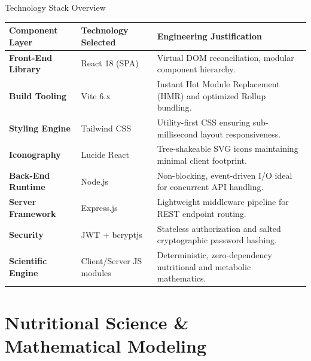 \documentclass[aspectratio=169,10pt]{beamer}
\begin{document}
\begin{frame}{Technology Stack Overview}
  \begin{table}[h]
    \centering
    \small
    \begin{tabular}{lll}
      \toprule
      \textbf{Component Layer} & \textbf{Technology Selected} & \textbf{Engineering Justification} \\
      \midrule
      \textbf{Front-End Library} & React 18 (SPA) & Virtual DOM reconciliation, modular component hierarchy. \\
      \textbf{Build Tooling} & Vite 6.x & Instant Hot Module Replacement (HMR) and optimized Rollup bundling. \\
      \textbf{Styling Engine} & Tailwind CSS & Utility-first CSS ensuring sub-millisecond layout responsiveness. \\
      \textbf{Iconography} & Lucide React & Tree-shakeable SVG icons maintaining minimal client footprint. \\
      \textbf{Back-End Runtime} & Node.js & Non-blocking, event-driven I/O ideal for concurrent API handling. \\
      \textbf{Server Framework} & Express.js & Lightweight middleware pipeline for REST endpoint routing. \\
      \textbf{Security} & JWT + bcryptjs & Stateless authorization and salted cryptographic password hashing. \\
      \textbf{Scientific Engine} & Client/Server JS modules & Deterministic, zero-dependency nutritional and metabolic mathematics. \\
      \bottomrule
    \end{tabular}
  \end{table}
\end{frame}

\section{Nutritional Science \& Mathematical Modeling}
\end{document}
